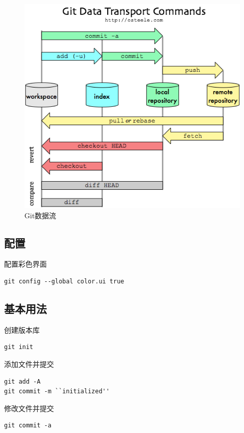 \begin{figure}[htpb]
    \begin{center}
        \includegraphics[keepaspectratio,width=0.5\paperwidth]{Pictures/git_dataflow.png}
    \end{center}
    \caption{Git数据流}
\end{figure}

\subsection{配置}
配置彩色界面
\begin{verbatim}
git config --global color.ui true
\end{verbatim}

\subsection{基本用法}
创建版本库

\begin{verbatim}
git init
\end{verbatim}

添加文件并提交

\begin{verbatim}
git add -A
git commit -m ``initialized''
\end{verbatim}


修改文件并提交
\begin{verbatim}
git commit -a
\end{verbatim}

